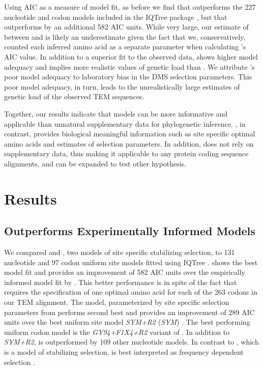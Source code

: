 Using AIC as a measure of model fit, as before we find that \phydms outperforms the 227 nucleotide and codon models included in the IQTree package \citep{bloom2014, bloom2017}, but that \selac outperforms \phydms by an additional 582 AIC units.
While very large, our estimate of \DeltaAIC between \selac and \phydms is likely an underestimate given the fact that we, conservatively, counted each inferred amino acid as a separate parameter when calculating \selac's AIC value.
In addition to a superior fit to the observed data, \selac shows higher model adequacy and implies more realistic values of genetic load than \phydms.
We attribute \phydms's poor model adequacy to laboratory bias in the DMS selection parameters.
This poor model adequacy, in turn, leads to the unrealistically large estimates of genetic load of the observed TEM sequences.

Together, our results indicate that models can be more informative and applicable than unnatural supplementary data for phylogenetic inference.
\selac, in contrast, provides biological meaningful information such as site specific optimal amino acids and estimates of selection parameters.
In addition, \selac does not rely on supplementary data, thus making it applicable to any protein coding sequence alignments, and can be expanded to test other hypothesis.

\section{Results}
\subsection{\selac Outperforms Experimentally Informed Models}

We compared \selac and \phydms, two models of site specific stabilizing selection, to 131 nucleotide and 97 codon uniform site models fitted using IQTree \citep[][see Table \ref{tab:AIC_selac} for the best performing models and Table \ref{tab:AIC_full} for all models]{nguyen2015}.
\selac shows the best model fit and provides an improvement of 582 AIC units over the empirically informed model fit by \phydms.
This better performance is in spite of the fact that \selac requires the specification of one optimal amino acid for each of the 263 codons in our TEM alignment.
The \phydms model, parameterized by site specific selection parameters from \citet{stiffler2016} performs second best and provides an improvement of 289 AIC units over the best uniform site model \emph{SYM+R2} (\emph{SYM}) \citet{zharkikh1994}. 
The best performing uniform codon model is the \emph{GY94+F1X4+R2} variant of \gy. 
In addition to \emph{SYM+R2}, \gy is outperformed by 109 other nucleotide models.
In contrast to \selac, which is a model of stabilizing selection, \gy is best interpreted as frequency dependent selection \citep{HughesAndNei1988,Nowak2006,Hughes2007,beaulieu2019}.

